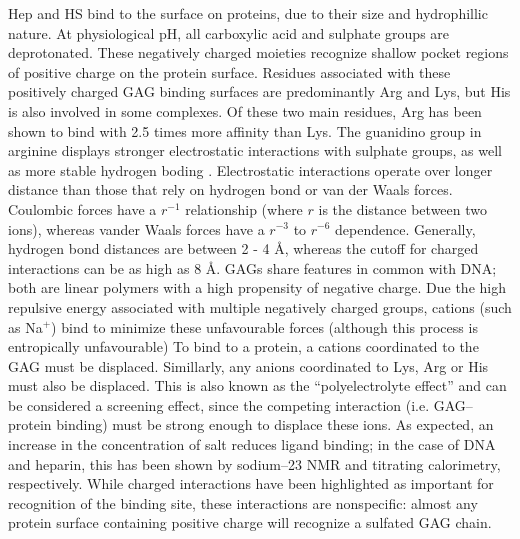 \documentclass[journal=jctcce,manuscript=article]{achemso}
\begin{document}
{\ac{Hep} and \ac{HS} bind to the surface on proteins, due to their size and hydrophillic nature. At physiological pH, all carboxylic acid and sulphate groups are deprotonated. 
These negatively charged moieties recognize shallow pocket regions of positive charge on the protein surface. Residues associated with these positively charged GAG binding surfaces are predominantly Arg and Lys, but His is also involved in some complexes. Of these two main residues, Arg has been shown to bind with 2.5 times more affinity than Lys. The guanidino group in arginine displays stronger electrostatic interactions with sulphate groups, as well as more stable hydrogen boding \cite{Hileman1998Glycosaminoglycan-proteinProteins}. Electrostatic interactions operate over longer distance than those that rely on hydrogen bond or van der Waals forces. Coulombic forces have a $ r^{-1}$  relationship (where $r$ is the distance between two ions), whereas vander Waals forces have a  $ r^{-3}$ to  $ r^{-6}$ dependence. \cite{Sankaranarayanan2014TowardProteins} 
Generally, hydrogen bond distances are between 2 - 4 \AA, whereas the cutoff for charged interactions can be as high as 8 \AA. \cite{FerreiradeFreitas2017APDB}
\acp{GAG} share features in common with DNA; both are linear polymers with a high propensity of negative charge. 
Due the high repulsive energy associated with multiple negatively charged groups, cations (such as Na$^{+}$) bind to minimize these unfavourable forces (although this process is entropically unfavourable)  \cite{Hileman1998Glycosaminoglycan-proteinProteins}
To bind to a protein, a cations coordinated to the \ac{GAG} must be displaced. Simillarly, any anions coordinated to Lys, Arg or His must also be displaced. This is also known as the ``polyelectrolyte effect'' and can be considered a screening effect, since the competing interaction (i.e. GAG--protein binding) must be strong enough to displace these ions.  
As expected, an increase in the concentration of salt reduces ligand binding; \cite{Capila2002Heparin-proteinInteractions., Gandhi2008TheProteins} 
in the case of DNA and heparin, this has been shown by sodium--23 NMR and titrating calorimetry, respectively\cite{Anderson1978Sodium-23Interactions., Thompson1994EnergeticDomain}.  
While charged interactions have been highlighted as important for recognition of the binding site\cite{Samsonov2016ComputationalComplexes}, these interactions are nonspecific: almost any protein surface containing positive charge will recognize a sulfated GAG chain. 

}
\end{document}
